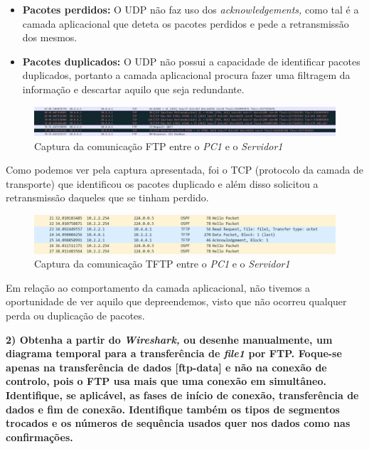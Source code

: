         \begin{itemize}
            \item \textbf{Pacotes perdidos:} O UDP não faz uso dos \textit{acknowledgements,} como tal é a camada aplicacional que deteta os pacotes perdidos e pede a retransmissão dos mesmos.
            \item \textbf{Pacotes duplicados:} O UDP não possui a capacidade de identificar pacotes duplicados, portanto a camada aplicacional procura fazer uma filtragem da informação e descartar aquilo que seja redundante.
        \end{itemize}

        \begin{figure}[hb!]
            \centering
            \includegraphics[width=\textwidth]{Imagens/1.png}
            \caption{Captura da comunicação FTP entre o \textit{PC1} e o \textit{Servidor1}}
            \vspace{-10pt}
        \end{figure}

        Como podemos ver pela captura apresentada, foi o TCP (protocolo da camada de transporte) que identificou os pacotes duplicado e além disso solicitou a retransmissão daqueles que se tinham perdido.

        \begin{figure}[hb!]
            \centering
            \includegraphics[width=\textwidth]{Imagens/2.png}
            \caption{Captura da comunicação TFTP entre o \textit{PC1} e o \textit{Servidor1}}
            \vspace{-10pt}
        \end{figure}

        Em relação ao comportamento da camada aplicacional, não tivemos a oportunidade de ver aquilo que depreendemos, visto que não ocorreu qualquer perda ou duplicação de pacotes.

        \textbf{2) Obtenha a partir do \textit{Wireshark,} ou desenhe manualmente, um diagrama temporal para a transferência de \textit{file1} por FTP. Foque-se apenas na transferência de dados [ftp-data] e não na conexão de controlo, pois o FTP usa mais que uma conexão em simultâneo. Identifique, se aplicável, as fases de início de conexão, transferência de dados e fim de conexão. Identifique também os tipos de segmentos trocados e os números de sequência usados quer nos dados como nas confirmações.}

